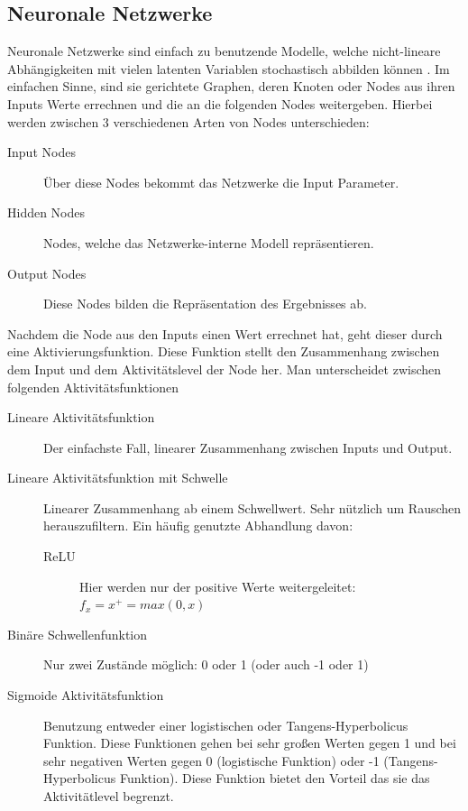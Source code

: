 \documentclass[pdftex,a4paper,halfparskip, article]{scrartcl}
\begin{document}
\subsection{Neuronale Netzwerke}
Neuronale Netzwerke sind einfach zu benutzende Modelle, welche nicht-lineare Abhängigkeiten mit vielen latenten Variablen stochastisch abbilden können \cite{nnWebsite}. Im einfachen Sinne, sind sie gerichtete Graphen, deren Knoten oder Nodes aus ihren Inputs Werte errechnen und die an die folgenden Nodes weitergeben. Hierbei werden zwischen 3 verschiedenen Arten von Nodes unterschieden:

\begin{description}
	\item[Input Nodes] Über diese Nodes bekommt das Netzwerke die Input Parameter.
	\item[Hidden Nodes] Nodes, welche das Netzwerke-interne Modell repräsentieren.
	\item[Output Nodes] Diese Nodes bilden die Repräsentation des Ergebnisses ab.
\end{description}

Nachdem die Node aus den Inputs einen Wert errechnet hat, geht dieser durch eine Aktivierungsfunktion. Diese Funktion stellt den Zusammenhang zwischen dem Input und dem Aktivitätslevel der Node her. Man unterscheidet zwischen folgenden Aktivitätsfunktionen

\begin{description}
	\item[Lineare Aktivitätsfunktion] Der einfachste Fall, linearer Zusammenhang zwischen Inputs und Output.
	\item[Lineare Aktivitätsfunktion mit Schwelle] Linearer Zusammenhang ab einem Schwellwert. Sehr nützlich um Rauschen herauszufiltern. Ein häufig genutzte Abhandlung davon:
	\begin{description}
		\item[ReLU] Hier werden nur der positive Werte weitergeleitet: \(f_x = x^+ = max(0,x) \)
	\end{description}
	\item[Binäre Schwellenfunktion] Nur zwei Zustände möglich: 0 oder 1 (oder auch -1 oder 1)
	\item[Sigmoide Aktivitätsfunktion] Benutzung entweder einer logistischen oder Tangens-Hyperbolicus Funktion. Diese Funktionen gehen bei sehr großen Werten gegen 1 und bei sehr negativen Werten gegen 0 (logistische Funktion) oder -1 (Tangens-Hyperbolicus Funktion). Diese Funktion bietet den Vorteil das sie das Aktivitätlevel begrenzt.
\end{description} 
\end{document}
